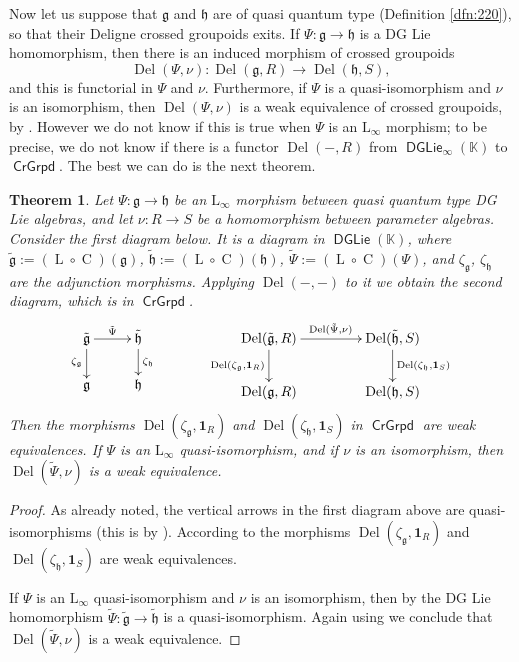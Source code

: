 \documentclass[a4paper, 10pt]{amsart}
\newtheorem{thm}[equation]{Theorem}
\theoremstyle{definition}
\numberwithin{equation}{section}
\newcommand{\opn}{\operatorname}
\newcommand{\cat}[1]{\operatorname{\mathsf{#1}}}
\newcommand{\mfrak}[1]{\mathfrak{#1}}
\newcommand{\mrm}[1]{\mathrm{#1}}
\newcommand{\mbb}[1]{\mathbb{#1}}
\newcommand{\bsym}[1]{\boldsymbol{#1}}
\newcommand{\til}[1]{\tilde{#1}}
\newcommand{\K}{\mbb{K}}
\newcommand{\g}{\mfrak{g}}
\newcommand{\h}{\mfrak{h}}
\begin{document}
Now let us suppose that $\g$ and $\h$ are of quasi quantum type
(Definition \ref{dfn:220}), so
that their Deligne crossed groupoids exits. If $\Psi : \g \to \h$ is a DG Lie
homomorphism, then there is an induced morphism of crossed groupoids
\begin{equation} \label{eqn:403}
\opn{Del}(\Psi, \nu) : \opn{Del}(\g, R) \to \opn{Del}(\h, S) ,
\end{equation}
and this is functorial in $\Psi$ and $\nu$. Furthermore, if $\Psi$ is a
quasi-isomorphism and $\nu$ is an isomorphism, then $\opn{Del}(\Psi, \nu)$ is a
weak equivalence of crossed groupoids, by \cite[Theorem 0.4]{Ye7}.
However we do not know if this is true when $\Psi$ is  an $\mrm{L}_{\infty}$
morphism; to be precise, we do not know if there is a functor $\opn{Del}(-,R)$
from $\cat{DGLie}_{\infty}(\K)$ to $\cat{CrGrpd}$. 
The best we can do is the next theorem. 

\begin{thm} \label{thm:400}
Let $\Psi : \g \to \h$ be an $\mrm{L}_{\infty}$ morphism between 
quasi quantum type DG Lie algebras, and let 
$\nu : R \to S$ be a homomorphism between parameter algebras.
Consider the first diagram below. It is a diagram in $\cat{DGLie}(\K)$, 
where $\til{\g} := (\opn{L} \circ \opn{C})(\g)$, 
$\til{\h} := (\opn{L} \circ \opn{C})(\h)$, 
$\til{\Psi} := (\opn{L} \circ \opn{C})(\Psi)$,
and $\zeta_{\g}$, $\zeta_{\h}$ are the adjunction morphisms.
Applying $\opn{Del}(-,-)$ to it we obtain the second diagram, which
is in $\cat{CrGrpd}$.
\[
\UseTips \xymatrix @C=6ex @R=4ex {
\til{\g}
\ar[d]_{\zeta_{\g}}
\ar[r]^(0.5){\til{\Psi}}
&
\til{\h}
\ar[d]^{\zeta_{\h}}
\\
\g
&
\h
} 
\hspace{8ex}
\UseTips \xymatrix @C=10ex @R=5ex {
\opn{Del}(\til{\g}, R)
\ar[d]_{\opn{Del}(\zeta_{\g}, \bsym{1}_R)}
\ar[r]^(0.5){\opn{Del}(\til{\Psi}, \nu)}
&
\opn{Del}(\til{\h}, S)
\ar[d]^{\opn{Del}(\zeta_{\h}, \bsym{1}_S)}
\\
\opn{Del}(\g, R)
&
\opn{Del}(\h, S)
}
\]
Then the morphisms $\opn{Del}(\zeta_{\g}, \bsym{1}_R)$ and 
$\opn{Del}(\zeta_{\h}, \bsym{1}_S)$ in $\cat{CrGrpd}$ are weak equivalences.
If $\Psi$ is an  $\mrm{L}_{\infty}$ quasi-isomorphism, 
and if $\nu$ is an isomorphism, then 
$\opn{Del}(\til{\Psi}, \nu)$ is a weak equivalence.
\end{thm}

\begin{proof}
As already noted, the vertical arrows in the first diagram above
are quasi-isomorphisms (this is by \cite[Proposition 4.4.3(1)]{Hi2}).
According to \cite[Theorem 6.13]{Ye7} the morphisms 
$\opn{Del}(\zeta_{\g}, \bsym{1}_R)$ and 
$\opn{Del}(\zeta_{\h}, \bsym{1}_S)$ are weak equivalences. 

If $\Psi$ is an $\mrm{L}_{\infty}$ quasi-isomorphism and $\nu$ is an
isomorphism, then by \cite[Lemma 7.3]{Ye7} the  DG Lie homomorphism
$\til{\Psi} : \til{\g} \to \til{\h}$ is a quasi-isomorphism.
Again using \cite[Theorem 6.13]{Ye7} we conclude that 
$\opn{Del}(\til{\Psi}, \nu)$ is a weak equivalence.
\end{proof}
\end{document}
